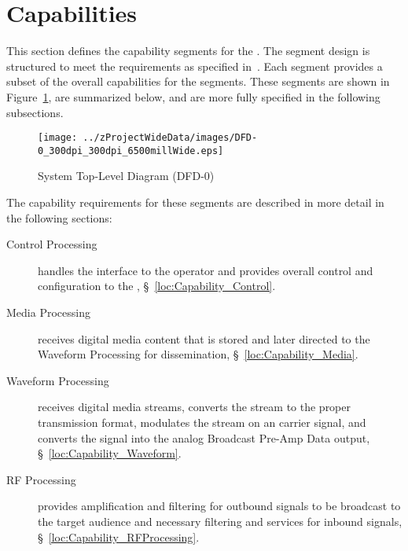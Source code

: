 \KNEADSECTIONNEWPAGE
\section{Capabilities}
\label{lab:sec_Capabilities}



This section defines the capability segments for the \ThisSys.
The segment design is structured to meet the requirements as specified in~\cite{ref__BDP_FOS_CDD}.
Each segment provides a subset of the overall capabilities for the \ThisSys segments.
These segments are shown in Figure~\ref{fig:DFD-0}, are summarized below, and are more fully specified in the following subsections.
\begin{figure}[htbp]
	\centering
		\texttt{[image: ../zProjectWideData/images/DFD-0\_300dpi\_300dpi\_6500millWide.eps]}
	\caption[System Top-Level Diagram]{System Top-Level Diagram (DFD-0)}
	\label{fig:DFD-0}
\end{figure}
 
The capability requirements for these segments are described in more detail in the following sections:
\begin{description}
	\item[Control Processing] handles the \HMI interface to the operator and provides overall control and configuration to the \ThisSys, \S~\ref{loc:Capability_Control}.
	\item[Media Processing] receives digital media content that is stored and later directed to the Waveform Processing for dissemination, \S~\ref{loc:Capability_Media}.
	\item[Waveform Processing] receives digital media streams, converts the stream to the proper transmission format, modulates the stream on an \RF carrier signal, and converts the \RF signal into the analog \RF Broadcast Pre-Amp Data output, \S~\ref{loc:Capability_Waveform}.
	\item[RF Processing] provides amplification and filtering for outbound \RF signals to be broadcast to the target audience and necessary filtering and \LNA services for inbound \RF signals, \S~\ref{loc:Capability_RFProcessing}.
\end{description}

\newpage
